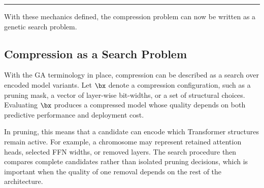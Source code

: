 \vspace{0.4em}
\noindent\rule{0.35\textwidth}{0.4pt}
\vspace{0.4em}

With these mechanics defined, the compression problem can now be written as a genetic search problem.

\subsection{Compression as a Search Problem}

With the GA terminology in place, compression can be described as a search over encoded model variants. Let $\bx$ denote a compression configuration, such as a pruning mask, a vector of layer-wise bit-widths, or a set of structural choices. Evaluating $\bx$ produces a compressed model whose quality depends on both predictive performance and deployment cost.

In pruning, this means that a candidate can encode which Transformer structures remain active. For example, a chromosome may represent retained attention heads, selected FFN widths, or removed layers. The search procedure then compares complete candidates rather than isolated pruning decisions, which is important when the quality of one removal depends on the rest of the architecture.
